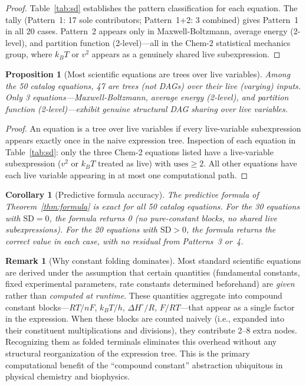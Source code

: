 \documentclass[12pt,a4paper]{article}
\newtheorem{corollary}[theorem]{Corollary}
\newtheorem{proposition}[theorem]{Proposition}
\theoremstyle{definition}
\newtheorem{remark}[theorem]{Remark}
\newcommand{\SD}{\mathrm{SD}}
\begin{document}
\begin{proof}
Table~\ref{tab:sd} establishes the pattern classification for each equation.
The tally (Pattern~1: 17 sole contributors; Pattern~1+2: 3 combined) gives
Pattern~1 in all 20 cases.  Pattern~2 appears only in Maxwell-Boltzmann,
average energy (2-level), and partition function (2-level)---all in the
Chem-2 statistical mechanics group, where $k_BT$ or $v^2$ appears as a
genuinely shared live subexpression.
\end{proof}

\begin{proposition}[Most scientific equations are trees over live variables]
\label{prop:trees}
Among the 50 catalog equations, 47 are \emph{trees} (not DAGs) over their
live (varying) inputs.  Only 3 equations---Maxwell-Boltzmann, average
energy (2-level), and partition function (2-level)---exhibit genuine
structural DAG sharing over live variables.
\end{proposition}

\begin{proof}
An equation is a tree over live variables if every live-variable
subexpression appears exactly once in the naive expression tree.  Inspection
of each equation in Table~\ref{tab:sd}: only the three Chem-2 equations
listed have a live-variable subexpression ($v^2$ or $k_BT$ treated as live)
with $\mathrm{uses} \geq 2$.  All other equations have each live variable
appearing in at most one computational path.
\end{proof}

\begin{corollary}[Predictive formula accuracy]
\label{cor:formula-accuracy}
The predictive formula of Theorem~\ref{thm:formula} is exact for all 50
catalog equations.  For the 30 equations with $\SD = 0$, the formula
returns 0 (no pure-constant blocks, no shared live subexpressions).
For the 20 equations with $\SD > 0$, the formula returns the correct
value in each case, with no residual from Patterns~3 or~4.
\end{corollary}

\begin{remark}[Why constant folding dominates]
Most standard scientific equations are derived under the assumption that
certain quantities (fundamental constants, fixed experimental parameters,
rate constants determined beforehand) are \emph{given} rather than
\emph{computed at runtime}.  These quantities aggregate into compound
constant blocks---$RT/nF$, $k_BT/h$, $\Delta H^\circ/R$, $F/RT$---that
appear as a single factor in the expression.  When these blocks are
counted naively (i.e., expanded into their constituent multiplications and
divisions), they contribute 2--8 extra nodes.  Recognizing them as folded
terminals eliminates this overhead without any structural reorganization
of the expression tree.  This is the primary computational benefit of the
``compound constant'' abstraction ubiquitous in physical chemistry and
biophysics.
\end{remark}
\end{document}
